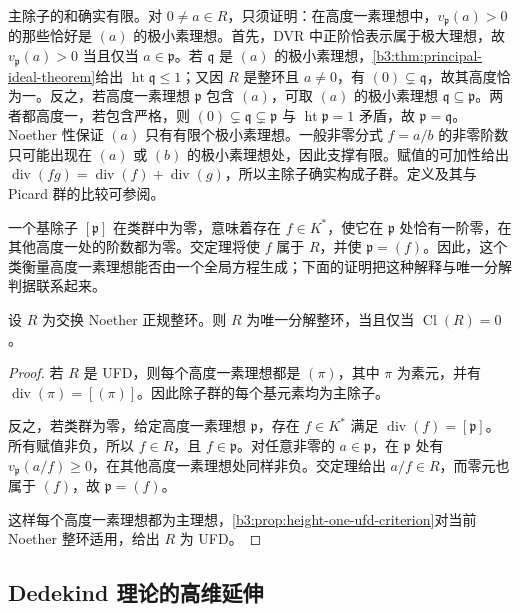 主除子的和确实有限。对 \(0\ne a\in R\)，只须证明：在高度一素理想中，\(v_{\mathfrak p}(a)>0\) 的那些恰好是 \((a)\) 的极小素理想。首先，DVR 中正阶恰表示属于极大理想，故 \(v_{\mathfrak p}(a)>0\) 当且仅当 \(a\in\mathfrak p\)。若 \(\mathfrak q\) 是 \((a)\) 的极小素理想，\cref{b3:thm:principal-ideal-theorem}给出 \(\operatorname{ht}\mathfrak q\le1\)；又因 \(R\) 是整环且 \(a\ne0\)，有 \((0)\subsetneq\mathfrak q\)，故其高度恰为一。反之，若高度一素理想 \(\mathfrak p\) 包含 \((a)\)，可取 \((a)\) 的极小素理想 \(\mathfrak q\subseteq\mathfrak p\)。两者都高度一，若包含严格，则 \((0)\subsetneq\mathfrak q\subsetneq\mathfrak p\) 与 \(\operatorname{ht}\mathfrak p=1\) 矛盾，故 \(\mathfrak p=\mathfrak q\)。Noether 性保证 \((a)\) 只有有限个极小素理想。一般非零分式 \(f=a/b\) 的非零阶数只可能出现在 \((a)\) 或 \((b)\) 的极小素理想处，因此支撑有限。赋值的可加性给出 \(\operatorname{div}(fg)=\operatorname{div}(f)+\operatorname{div}(g)\)，所以主除子确实构成子群。定义及其与 Picard 群的比较可参阅\cite[\S20, pp. 165--167]{Matsumura1989CommutativeRingTheory}。

\ProseParagraphBreak
一个基除子 \([\mathfrak p]\) 在类群中为零，意味着存在 \(f\in K^*\)，使它在 \(\mathfrak p\) 处恰有一阶零，在其他高度一处的阶数都为零。交定理将使 \(f\) 属于 \(R\)，并使 \(\mathfrak p=(f)\)。因此，这个类衡量高度一素理想能否由一个全局方程生成；下面的证明把这种解释与唯一分解判据联系起来。

\begin{theorem}\label{b3:thm:class-zero-ufd}
	设 \(R\) 为交换 Noether 正规整环。则 \(R\) 为唯一分解整环，当且仅当 \(\operatorname{Cl}(R)=0\)。
\end{theorem}
\begin{proof}
	若 \(R\) 是 UFD，则每个高度一素理想都是 \((\pi)\)，其中 \(\pi\) 为素元，并有 \(\operatorname{div}(\pi)=[(\pi)]\)。因此除子群的每个基元素均为主除子。

	反之，若类群为零，给定高度一素理想 \(\mathfrak p\)，存在 \(f\in K^*\) 满足 \(\operatorname{div}(f)=[\mathfrak p]\)。所有赋值非负，所以 \(f\in R\)，且 \(f\in\mathfrak p\)。对任意非零的 \(a\in\mathfrak p\)，在 \(\mathfrak p\) 处有 \(v_{\mathfrak p}(a/f)\ge0\)，在其他高度一素理想处同样非负。交定理给出 \(a/f\in R\)，而零元也属于 \((f)\)，故 \(\mathfrak p=(f)\)。

	这样每个高度一素理想都为主理想，\cref{b3:prop:height-one-ufd-criterion}对当前 Noether 整环适用，给出 \(R\) 为 UFD。
\end{proof}

\subsection{Dedekind 理论的高维延伸}
\label{b3:subsec:2003:03}

